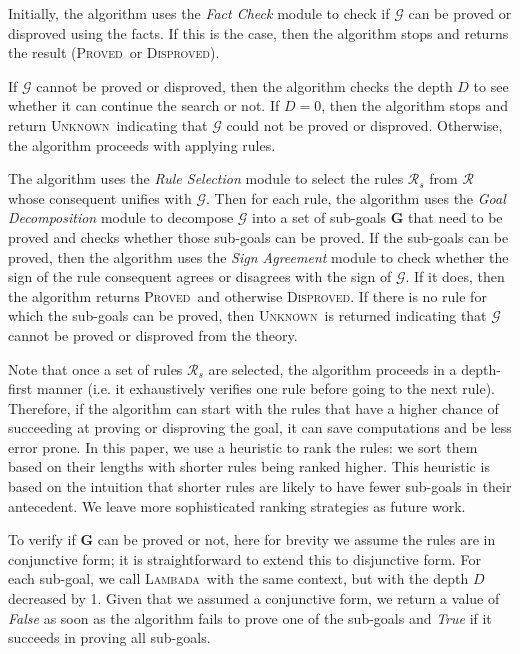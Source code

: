 \documentclass[11pt]{article}
\newcommand{\rules}[1]{\ensuremath{\mathcal{#1}}}
\newcommand{\goal}[1]{\ensuremath{\mathcal{#1}}}
\newcommand{\algo}{\textsc{Lambada}}
\newcommand{\proved}{\textsc{Proved}}
\newcommand{\disproved}{\textsc{Disproved}}
\newcommand{\unk}{\textsc{Unknown}}
\newcommand{\module}[1]{\emph{#1}}
\begin{document}
Initially, the algorithm uses the \module{Fact Check} module to check if \goal{G} can be proved or disproved using the facts. If this is the case, then the algorithm stops and returns the result (\proved\ or \disproved). 

If \goal{G} cannot be proved or disproved, then the algorithm checks the depth $D$ to see whether it can continue the search or not. If $D=0$, then the algorithm stops and return \unk\ indicating that \goal{G} could not be proved or disproved. Otherwise, the algorithm proceeds with applying rules.

The algorithm uses the \module{Rule Selection} module to select the rules $\rules{R}_s$ from $\rules{R}$ whose consequent unifies with \goal{G}.
Then for each rule, the algorithm uses the \module{Goal Decomposition} module to decompose \goal{G} into a set of sub-goals $\mathbf{G}$ that need to be proved and checks whether those sub-goals can be proved. If the sub-goals can be proved, then the algorithm uses the \module{Sign Agreement} module to check whether the sign of the rule consequent agrees or disagrees with the sign of \goal{G}. If it does, then the algorithm returns \proved\ and otherwise \disproved. If there is no rule for which the sub-goals can be proved, then \unk\ is returned indicating that \goal{G} cannot be proved or disproved from the theory.

Note that once a set of rules $\rules{R}_s$ are selected, the algorithm proceeds in a depth-first manner (i.e. it exhaustively verifies one rule before going to the next rule). Therefore, if the algorithm can start with the rules that have a higher chance of succeeding at proving or disproving the goal, it can save computations and be less error prone. In this paper, we use a heuristic to rank the rules: we sort them based on their lengths with shorter rules being ranked higher. 
This heuristic is based on the intuition that shorter rules are likely to have fewer sub-goals in their antecedent. We leave more sophisticated ranking strategies as future work.

To verify if $\mathbf{G}$ can be proved or not, here for brevity we assume the rules are in conjunctive form; it is straightforward to extend this to disjunctive form. For each sub-goal, we call \algo\ with the same context, but with the depth $D$ decreased by 1. Given that we assumed a conjunctive form, we return a value of \emph{False} as soon as the algorithm fails to prove one of the sub-goals and \emph{True} if it succeeds in proving all sub-goals.
\end{document}
